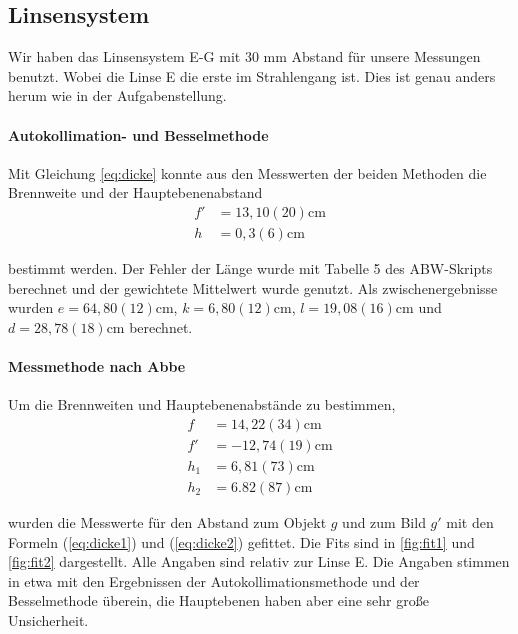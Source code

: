 \documentclass[11pt, a4paper]{article}
\begin{document}
    \subsection{Linsensystem}
    Wir haben das Linsensystem E-G mit $30$ mm Abstand für unsere Messungen benutzt. Wobei die Linse E die erste im Strahlengang ist. Dies ist genau anders herum wie in der Aufgabenstellung.

    \paragraph{Autokollimation- und Besselmethode}
    Mit Gleichung \ref{eq:dicke} konnte aus den Messwerten der beiden Methoden die Brennweite und der Hauptebenenabstand
    \begin{align}
        f' &= 13,10(20) \si{\centi\metre} \\
        h &= 0,3(6) \si{\centi\metre}
    \end{align}

    bestimmt werden. Der Fehler der Länge wurde mit Tabelle 5 des ABW-Skripts \cite{ABW} berechnet und der gewichtete Mittelwert wurde genutzt. Als zwischenergebnisse wurden $e = 64,80(12) \si{\centi\metre}$, $k = 6,80(12) \si{\centi\metre}$, $l = 19,08(16) \si{\centi\metre}$ und $d = 28,78(18) \si{\centi\metre}$ berechnet.


    \paragraph{Messmethode nach Abbe}
    Um die Brennweiten und Hauptebenenabstände zu bestimmen,
    \begin{align}
        f &= 14,22(34) \si{\centi\metre} \\
        f' &= -12,74(19) \si{\centi\metre} \\
        h_1 &= 6,81(73) \si{\centi\metre} \\

        h_2 &= 6.82(87) \si{\centi\metre}
    \end{align}
    
    wurden die Messwerte für den Abstand zum Objekt $g$ und zum Bild $g'$ mit den Formeln (\ref{eq:dicke1}) und (\ref{eq:dicke2}) gefittet. Die Fits sind in \ref{fig:fit1} und \ref{fig:fit2} dargestellt. Alle Angaben sind relativ zur Linse E. Die Angaben stimmen in etwa mit den Ergebnissen der Autokollimationsmethode und der Besselmethode überein, die Hauptebenen haben aber eine sehr große Unsicherheit.
\end{document}
